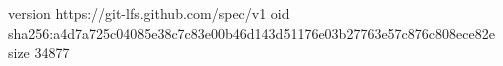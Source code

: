 version https://git-lfs.github.com/spec/v1
oid sha256:a4d7a725c04085e38c7c83e00b46d143d51176e03b27763e57c876c808ece82e
size 34877
